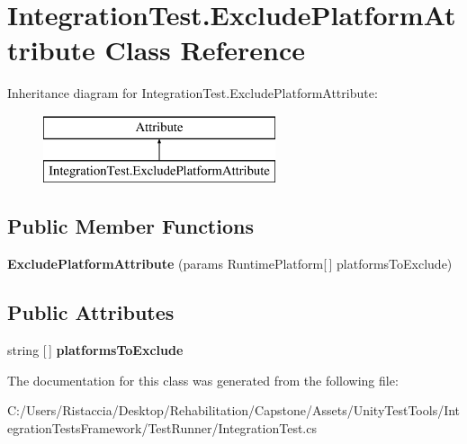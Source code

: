 \hypertarget{class_integration_test_1_1_exclude_platform_attribute}{}\section{Integration\+Test.\+Exclude\+Platform\+Attribute Class Reference}
\label{class_integration_test_1_1_exclude_platform_attribute}
Inheritance diagram for Integration\+Test.\+Exclude\+Platform\+Attribute\+:\begin{figure}[H]
\begin{center}
\leavevmode
\includegraphics[height=2.000000cm]{class_integration_test_1_1_exclude_platform_attribute}
\end{center}
\end{figure}
\subsection*{Public Member Functions}
\begin{DoxyCompactItemize}
\item 
\mbox{\label{class_integration_test_1_1_exclude_platform_attribute_a7c2012f0a57bc5d2477b42de1cba8045}} 
{\bfseries Exclude\+Platform\+Attribute} (params Runtime\+Platform\mbox{[}$\,$\mbox{]} platforms\+To\+Exclude)
\end{DoxyCompactItemize}
\subsection*{Public Attributes}
\begin{DoxyCompactItemize}
\item 
\mbox{\label{class_integration_test_1_1_exclude_platform_attribute_a62324b04100702539f5721ee67eaf16e}} 
string \mbox{[}$\,$\mbox{]} {\bfseries platforms\+To\+Exclude}
\end{DoxyCompactItemize}


The documentation for this class was generated from the following file\+:\begin{DoxyCompactItemize}
\item 
C\+:/\+Users/\+Ristaccia/\+Desktop/\+Rehabilitation/\+Capstone/\+Assets/\+Unity\+Test\+Tools/\+Integration\+Tests\+Framework/\+Test\+Runner/Integration\+Test.\+cs\end{DoxyCompactItemize}
